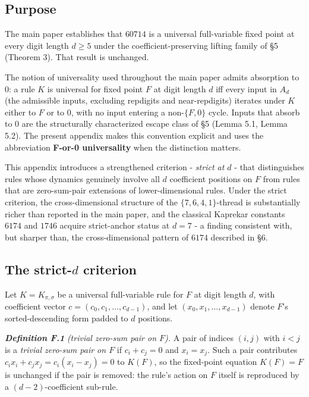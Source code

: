 \documentclass[11pt,letterpaper]{article}
\theoremstyle{paperstyle}
\theoremstyle{paperstyledef}
\theoremstyle{paperstylerem}
\begin{document}
\hypertarget{f.1-purpose}{%
\subsection{Purpose}\label{f.1-purpose}}

The main paper establishes that \(60714\) is a universal full-variable
fixed point at every digit length \(d \geq 5\) under the
coefficient-preserving lifting family of §5 (Theorem 3). That result is
unchanged.

The notion of universality used throughout the main paper admits
absorption to \(0\): a rule \(K\) is universal for fixed point \(F\) at
digit length \(d\) iff every input in \(A_d\) (the admissible inputs,
excluding repdigits and near-repdigits) iterates under \(K\) either to
\(F\) or to \(0\), with no input entering a non-\(\{F, 0\}\) cycle.
Inputs that absorb to \(0\) are the structurally characterized escape
class of §5 (Lemma 5.1, Lemma 5.2). The present appendix makes this
convention explicit and uses the abbreviation \textbf{F-or-0
universality} when the distinction matters.

This appendix introduces a strengthened criterion - \emph{strict at
\(d\)} - that distinguishes rules whose dynamics genuinely involve all
\(d\) coefficient positions on \(F\) from rules that are zero-sum-pair
extensions of lower-dimensional rules. Under the strict criterion, the
cross-dimensional structure of the \(\{7, 6, 4, 1\}\)-thread is
substantially richer than reported in the main paper, and the classical
Kaprekar constants \(6174\) and \(1746\) acquire strict-anchor status at
\(d = 7\) - a finding consistent with, but sharper than, the
cross-dimensional pattern of \(6174\) described in §6.

\hypertarget{f.2-the-strict-d-criterion}{%
\subsection{\texorpdfstring{The strict-\(d\) criterion}{The strict-d criterion}}\label{f.2-the-strict-d-criterion}}

Let \(K = K_{\pi, \sigma}\) be a universal full-variable rule for \(F\)
at digit length \(d\), with coefficient vector
\(c = (c_0, c_1, \ldots, c_{d-1})\), and let
\((x_0, x_1, \ldots, x_{d-1})\) denote \(F\)'s sorted-descending form
padded to \(d\) positions.

\textbf{\emph{Definition F.1}} \emph{(trivial zero-sum pair on \(F\)).}
A pair of indices \((i, j)\) with \(i < j\) is a \emph{trivial zero-sum
pair on \(F\)} if \(c_i + c_j = 0\) and \(x_i = x_j\). Such a pair
contributes \(c_i x_i + c_j x_j = c_i (x_i - x_j) = 0\) to \(K(F)\), so
the fixed-point equation \(K(F) = F\) is unchanged if the pair is
removed: the rule's action on \(F\) itself is reproduced by a
\((d-2)\)-coefficient sub-rule.
\end{document}
